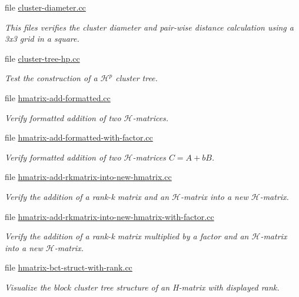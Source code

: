 \begin{DoxyCompactItemize}
file \hyperlink{cluster-diameter_8cc}{cluster-\/diameter.\+cc}
\begin{DoxyCompactList}\small\item\em This files verifies the cluster diameter and pair-\/wise distance calculation using a 3x3 grid in a square. \end{DoxyCompactList}\item 
file \hyperlink{cluster-tree-hp_8cc}{cluster-\/tree-\/hp.\+cc}
\begin{DoxyCompactList}\small\item\em Test the construction of a $\mathcal{H}^p$ cluster tree. \end{DoxyCompactList}\item 
file \hyperlink{hmatrix-add-formatted_8cc}{hmatrix-\/add-\/formatted.\+cc}
\begin{DoxyCompactList}\small\item\em Verify formatted addition of two $\mathcal{H}$-\/matrices. \end{DoxyCompactList}\item 
file \hyperlink{hmatrix-add-formatted-with-factor_8cc}{hmatrix-\/add-\/formatted-\/with-\/factor.\+cc}
\begin{DoxyCompactList}\small\item\em Verify formatted addition of two $\mathcal{H}$-\/matrices $C = A + b B$. \end{DoxyCompactList}\item 
file \hyperlink{hmatrix-add-rkmatrix-into-new-hmatrix_8cc}{hmatrix-\/add-\/rkmatrix-\/into-\/new-\/hmatrix.\+cc}
\begin{DoxyCompactList}\small\item\em Verify the addition of a rank-\/k matrix and an $\mathcal{H}$-\/matrix into a new $\mathcal{H}$-\/matrix. \end{DoxyCompactList}\item 
file \hyperlink{hmatrix-add-rkmatrix-into-new-hmatrix-with-factor_8cc}{hmatrix-\/add-\/rkmatrix-\/into-\/new-\/hmatrix-\/with-\/factor.\+cc}
\begin{DoxyCompactList}\small\item\em Verify the addition of a rank-\/k matrix multiplied by a factor and an $\mathcal{H}$-\/matrix into a new $\mathcal{H}$-\/matrix. \end{DoxyCompactList}\item 
file \hyperlink{hmatrix-bct-struct-with-rank_8cc}{hmatrix-\/bct-\/struct-\/with-\/rank.\+cc}
\begin{DoxyCompactList}\small\item\em Visualize the block cluster tree structure of an H-\/matrix with displayed rank. \end{DoxyCompactList}\item 

\end{DoxyCompactItemize}
